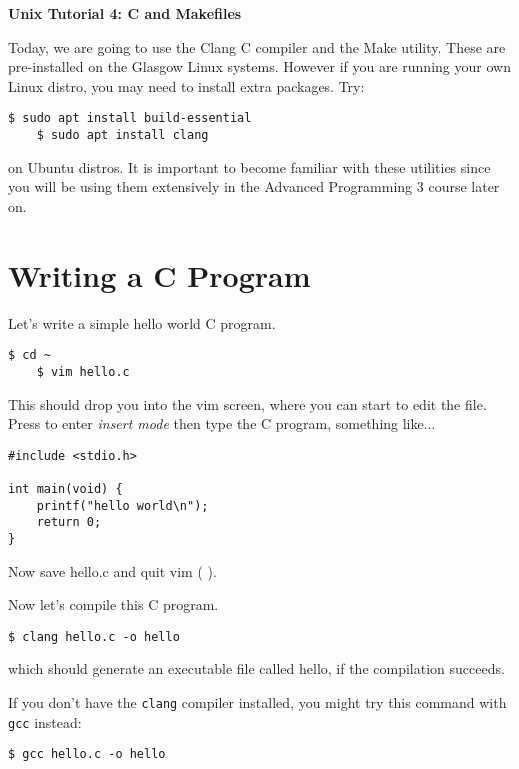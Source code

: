 \documentclass{article}
\begin{document}
\noindent
{\Large \textsf{\textbf{Unix Tutorial 4: C and Makefiles}}}

\bigskip


Today, we are going to use the Clang C compiler and the Make utility. These are pre-installed on the Glasgow Linux systems. However if you are running your own Linux distro, you may need to install extra packages. Try:
\begin{lstlisting}[style=BashInputStyle]
    $ sudo apt install build-essential
    $ sudo apt install clang
\end{lstlisting}
on Ubuntu distros.
It is important to become familiar with these utilities since you will be using them extensively in the Advanced Programming 3 course later on.

\section*{Writing a C Program}

Let's write a simple hello world C program.

\begin{lstlisting}[style=BashInputStyle]
    $ cd ~
    $ vim hello.c
\end{lstlisting}

This should drop you into the vim screen, where you can start to edit the file. Press  to enter \textit{insert mode} then type the C program, something like...

\begin{lstlisting}[style=CeeProg]
#include <stdio.h>

int main(void) {
    printf("hello world\n");
    return 0;
}
\end{lstlisting}

Now save hello.c and quit vim (\keys{\esc} \keys{:}   \keys{\enter}).

Now let's compile this C program. 
\begin{lstlisting}[style=BashInputStyle]
    $ clang hello.c -o hello
\end{lstlisting}
which should generate an executable file called hello, if the compilation succeeds.

If you don't have the \texttt{clang} compiler installed, you might try this command with \texttt{gcc} instead:

\begin{lstlisting}[style=BashInputStyle]
    $ gcc hello.c -o hello
\end{lstlisting}
\end{document}
